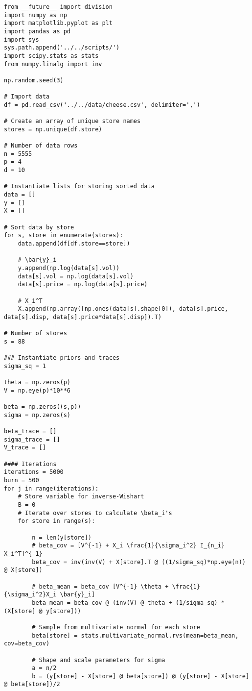 \documentclass[11pt]{article}
\begin{document}
    \begin{lstlisting}
from __future__ import division
import numpy as np 
import matplotlib.pyplot as plt
import pandas as pd
import sys
sys.path.append('../../scripts/')
import scipy.stats as stats
from numpy.linalg import inv

np.random.seed(3)

# Import data
df = pd.read_csv('../../data/cheese.csv', delimiter=',')

# Create an array of unique store names
stores = np.unique(df.store)

# Number of data rows
n = 5555
p = 4
d = 10

# Instantiate lists for storing sorted data
data = []
y = []
X = []

# Sort data by store
for s, store in enumerate(stores):
    data.append(df[df.store==store])

    # \bar{y}_i
    y.append(np.log(data[s].vol))
    data[s].vol = np.log(data[s].vol)
    data[s].price = np.log(data[s].price)

    # X_i^T
    X.append(np.array([np.ones(data[s].shape[0]), data[s].price, data[s].disp, data[s].price*data[s].disp]).T)

# Number of stores
s = 88

### Instantiate priors and traces
sigma_sq = 1

theta = np.zeros(p)
V = np.eye(p)*10**6

beta = np.zeros((s,p))
sigma = np.zeros(s)

beta_trace = []
sigma_trace = []
V_trace = []

#### Iterations
iterations = 5000
burn = 500
for j in range(iterations):
    # Store variable for inverse-Wishart
    B = 0
    # Iterate over stores to calculate \beta_i's
    for store in range(s):

        n = len(y[store])
        # beta_cov = [V^{-1} + X_i \frac{1}{\sigma_i^2} I_{n_i} X_i^T]^{-1}
        beta_cov = inv(inv(V) + X[store].T @ ((1/sigma_sq)*np.eye(n)) @ X[store])

        # beta_mean = beta_cov [V^{-1} \theta + \frac{1}{\sigma_i^2}X_i \bar{y}_i]
        beta_mean = beta_cov @ (inv(V) @ theta + (1/sigma_sq) * (X[store] @ y[store]))

        # Sample from multivariate normal for each store
        beta[store] = stats.multivariate_normal.rvs(mean=beta_mean, cov=beta_cov)

        # Shape and scale parameters for sigma
        a = n/2
        b = (y[store] - X[store] @ beta[store]) @ (y[store] - X[store] @ beta[store])/2


\end{lstlisting}
\end{document}
